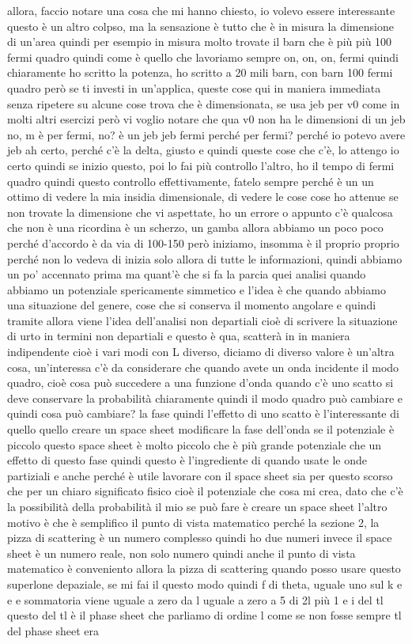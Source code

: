 \begin{soluzione}
   allora, faccio notare una cosa che mi hanno chiesto, io volevo essere interessante questo è un altro colpso, ma la sensazione è tutto che è in misura la dimensione di un'area quindi per esempio in misura molto trovate il barn che è più più 100 fermi quadro quindi come è quello che lavoriamo sempre on, on, on, fermi quindi chiaramente ho scritto la potenza, ho scritto a 20 mili barn, con barn 100 fermi quadro però se ti investi in un'applica, queste cose qui in maniera immediata senza ripetere su alcune cose trova che è dimensionata, se usa jeb per v0 come in molti altri esercizi però vi voglio notare che qua v0 non ha le dimensioni di un jeb no, m è per fermi, no? è un jeb jeb fermi perché per fermi? perché io potevo avere jeb ah certo, perché c'è la delta, giusto e quindi queste cose che c'è, lo attengo io certo quindi se inizio questo, poi lo fai più controllo l'altro, ho il tempo di fermi quadro quindi questo controllo effettivamente, fatelo sempre perché è un un ottimo di vedere la mia insidia dimensionale, di vedere le cose cose ho attenue se non trovate la dimensione che vi aspettate, ho un errore o appunto c'è qualcosa che non è una ricordina è un scherzo, un gamba allora abbiamo un poco poco perché d'accordo è da via di 100-150 però iniziamo, insomma è il proprio proprio perché non lo vedeva di inizia solo allora di tutte le informazioni, quindi abbiamo un po' accennato prima ma quant'è che si fa la parcia quei analisi quando abbiamo un potenziale spericamente simmetico e l'idea è che quando abbiamo una situazione del genere, cose che si conserva il momento angolare e quindi tramite allora viene l'idea dell'analisi non departiali cioè di scrivere la situazione di urto in termini non departiali e questo è qua, scatterà in in maniera indipendente cioè i vari modi con L diverso, diciamo di diverso valore è un'altra cosa, un'interessa c'è da considerare che quando avete un onda incidente il modo quadro, cioè cosa può succedere a una funzione d'onda quando c'è uno scatto si deve conservare la probabilità chiaramente quindi il modo quadro può cambiare e quindi cosa può cambiare? la fase quindi l'effetto di uno scatto è l'interessante di quello quello creare un space sheet modificare la fase dell'onda se il potenziale è piccolo questo space sheet è molto piccolo che è più grande potenziale che un effetto di questo fase quindi questo è l'ingrediente di quando usate le onde partiziali e anche perché è utile lavorare con il space sheet sia per questo scorso che per un chiaro significato fisico cioè il potenziale che cosa mi crea, dato che c'è la possibilità della probabilità il mio se può fare è creare un space sheet l'altro motivo è che è semplifico il punto di vista matematico perché la sezione 2, la pizza di scattering è un numero complesso quindi ho due numeri invece il space sheet è un numero reale, non solo numero quindi anche il punto di vista matematico è conveniento allora la pizza di scattering quando posso usare questo superlone depaziale, se mi fai il questo modo quindi f di theta, uguale uno sul k e e e sommatoria viene uguale a zero da l uguale a zero a 5 di 2l più 1 e i del tl questo del tl è il phase sheet che parliamo di ordine l come se non fosse sempre tl del phase sheet era 
\end{soluzione}
